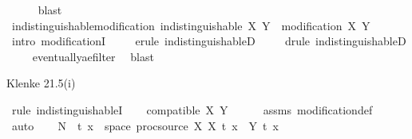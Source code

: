 \begin{isabellebody}
\ \ \ \ \isamarkupfalse%
\ blast\isanewline
{}\isamarkupfalse%
%
\endisatagproof
{\isafoldproof}%
%
\isadelimproof
\isanewline
%
\endisadelimproof
\isanewline
{}\isamarkupfalse%
\ indistinguishable{\isacharunderscore}{\kern0pt}modification{\isacharcolon}{\kern0pt}\ {\isachardoublequoteopen}indistinguishable\ X\ Y\ {\isasymLongrightarrow}\ modification\ X\ Y{\isachardoublequoteclose}\isanewline
%
\isadelimproof
\ \ %
\endisadelimproof
%
\isatagproof
{}\isamarkupfalse%
\ {\isacharparenleft}{\kern0pt}intro\ modificationI{\isacharparenright}{\kern0pt}\isanewline
\ \ \ \isamarkupfalse%
\ {\isacharparenleft}{\kern0pt}erule\ indistinguishableD{\isacharparenleft}{\kern0pt}{}{\isacharparenright}{\kern0pt}{\isacharparenright}{\kern0pt}\isanewline
\ \ \ \isamarkupfalse%
\ {\isacharparenleft}{\kern0pt}drule\ indistinguishableD{\isacharparenleft}{\kern0pt}{}{\isacharparenright}{\kern0pt}{\isacharparenright}{\kern0pt}\isanewline
\ \ \ \isamarkupfalse%
\ eventually{\isacharunderscore}{\kern0pt}ae{\isacharunderscore}{\kern0pt}filter\ \isamarkupfalse%
\ blast%
\endisatagproof
{\isafoldproof}%
%
\isadelimproof
%
\endisadelimproof
%
\begin{isamarkuptext}%
Klenke 21.5(i)%
\end{isamarkuptext}\isamarkuptrue%
%
%
\isadelimproof
%
\endisadelimproof
%
\isatagproof
{}\isamarkupfalse%
\ {\isacharparenleft}{\kern0pt}rule\ indistinguishableI{\isacharparenright}{\kern0pt}\isanewline
\ \ \isamarkupfalse%
\ {\isachardoublequoteopen}compatible\ X\ Y{\isachardoublequoteclose}\isanewline
\ \ \ \ \isamarkupfalse%
\ assms{\isacharparenleft}{\kern0pt}{}{\isacharparenright}{\kern0pt}\ modification{\isacharunderscore}{\kern0pt}def\ \isamarkupfalse%
\ auto\isanewline
\ \ \isamarkupfalse%
\ {\isacharquery}{\kern0pt}N\ {\isacharequal}{\kern0pt}\ {\isachardoublequoteopen}{\isacharparenleft}{\kern0pt}{\isasymlambda}t{\isachardot}{\kern0pt}\ {\isacharbraceleft}{\kern0pt}x\ {\isasymin}\ space\ {\isacharparenleft}{\kern0pt}proc{\isacharunderscore}{\kern0pt}source\ X{\isacharparenright}{\kern0pt}{\isachardot}{\kern0pt}\ X\ t\ x\ {\isasymnoteq}\ Y\ t\ x{\isacharbraceright}{\kern0pt}{\isacharparenright}{\kern0pt}{\isachardoublequoteclose}\isanewline

\end{isabellebody}
